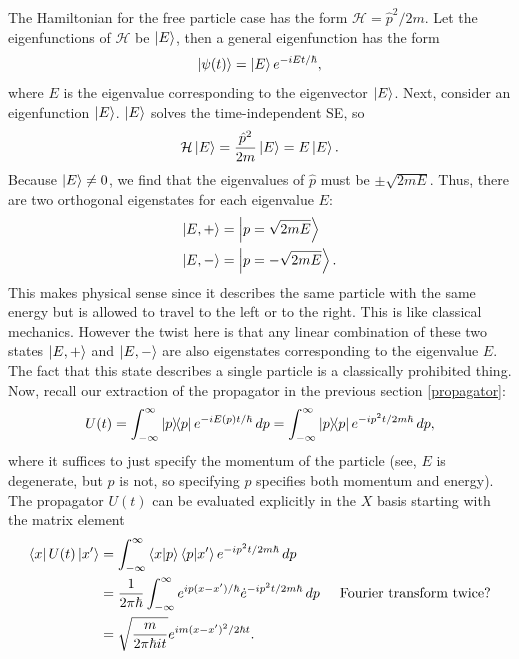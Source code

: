 \documentclass{book}
\theoremstyle{definition}
\newcommand{\ham}{\mathcal{H}}
\newcommand{\f}[2]{\frac{#1}{#2}}
\begin{document}
The Hamiltonian for the free particle case has the form $\ham = \hat{p}^2/2m$. Let the eigenfunctions of $\ham$ be $\ket{E}$, then a general eigenfunction has the form
\begin{align}
\ket{\psi(t)} = \ket{E}e^{-iEt/\hbar},
\end{align}
where $E$ is the eigenvalue corresponding to the eigenvector $\ket{E}$. Next, consider an eigenfunction $\ket{E}$. $\ket{E}$ solves the time-independent SE, so
\begin{align}
\ham\ket{E} = \f{\hat{p}^2}{2m}\ket{E} = E\ket{E}.
\end{align}
Because $\ket{E} \neq 0$, we find that the eigenvalues of $\hat{p}$ must be $\pm \sqrt{2mE}$. Thus, there are two orthogonal eigenstates for each eigenvalue $E$:
\begin{align}
\ket{E, +} &= \ket{p = \sqrt{2mE}}\\
\ket{E, -} &= \ket{p = -\sqrt{2mE}}.
\end{align}
This makes physical sense since it describes the same particle with the same energy but is allowed to travel to the left or to the right. This is like classical mechanics. However the twist here is that any linear combination of these two states $\ket{E, +}$ and $\ket{E, -}$ are also eigenstates corresponding to the eigenvalue $E$. The fact that this state describes a single particle is a classically prohibited thing.\\

Now, recall our extraction of the propagator in the previous section \eqref{propagator}:
\begin{align}
U(t) = \int^\infty_{-\infty} \ketbra{p} e^{-iE(p)t/\hbar}\,dp  = \int^\infty_{-\infty} \ketbra{p} e^{-ip^2t/2m\hbar}\,dp,
\end{align}
where it suffices to just specify the momentum of the particle (see, $E$ is degenerate, but $p$ is not, so specifying $p$ specifies both momentum and energy). \\

The propagator $U(t)$ can be evaluated explicitly in the $X$ basis starting with the matrix element
\begin{align}\label{free-propagator}
\bra{x}U(t)\ket{x'} &= \int_{-\infty}^\infty \braket{x}{p}\braket{p}{x'}e^{-ip^2t/2m\hbar}\,dp\\
&= \f{1}{2\pi \hbar}\int_{-\infty}^\infty e^{ip(x-x')/\hbar} \dot e^{-ip^2 t/2m\hbar}\,dp  \hspace{0.5cm}\text{Fourier transform twice?}\\
&= \sqrt{\f{m}{2\pi \hbar it}} e^{im(x-x')^2/2\hbar t}.
\end{align}
\end{document}
